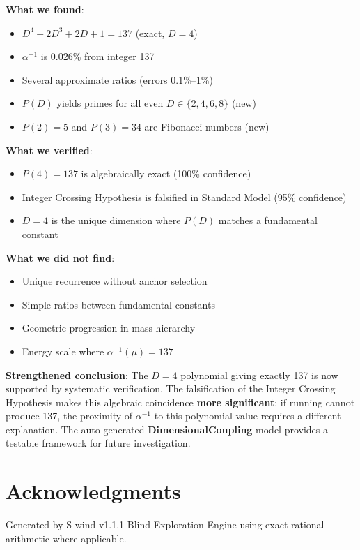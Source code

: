 \documentclass[11pt,a4paper]{article}
\begin{document}
\textbf{What we found}:
\begin{itemize}
    \item $D^4 - 2D^3 + 2D + 1 = 137$ (exact, $D=4$)
    \item $\alpha^{-1}$ is 0.026\% from integer 137
    \item Several approximate ratios (errors 0.1\%--1\%)
    \item $P(D)$ yields primes for all even $D \in \{2, 4, 6, 8\}$ (new)
    \item $P(2) = 5$ and $P(3) = 34$ are Fibonacci numbers (new)
\end{itemize}

\textbf{What we verified}:
\begin{itemize}
    \item $P(4) = 137$ is algebraically exact (100\% confidence)
    \item Integer Crossing Hypothesis is falsified in Standard Model (95\% confidence)
    \item $D=4$ is the unique dimension where $P(D)$ matches a fundamental constant
\end{itemize}

\textbf{What we did not find}:
\begin{itemize}
    \item Unique recurrence without anchor selection
    \item Simple ratios between fundamental constants
    \item Geometric progression in mass hierarchy
    \item Energy scale where $\alpha^{-1}(\mu) = 137$
\end{itemize}

\textbf{Strengthened conclusion}: The $D=4$ polynomial giving exactly 137 is now supported by systematic verification. The falsification of the Integer Crossing Hypothesis makes this algebraic coincidence \textbf{more significant}: if running cannot produce 137, the proximity of $\alpha^{-1}$ to this polynomial value requires a different explanation. The auto-generated \textbf{DimensionalCoupling} model provides a testable framework for future investigation.

\section*{Acknowledgments}

Generated by S-wind v1.1.1 Blind Exploration Engine using exact rational arithmetic where applicable.
\end{document}
